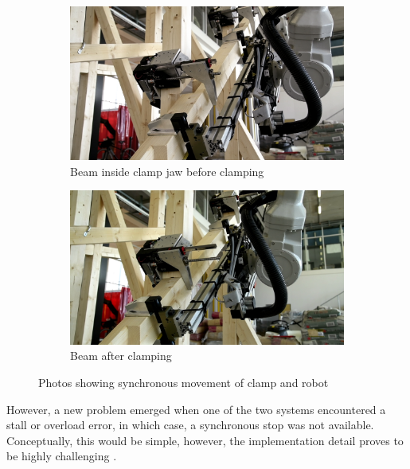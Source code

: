 \begin{figure}
    \centering
    \begin{subfigure}[b]{0.49\textwidth}
        \centering
        \includegraphics[width=\textwidth]{images/05/image86.png}
        \caption{Beam inside clamp jaw before clamping}
    \end{subfigure}
    \hfill
    \begin{subfigure}[b]{0.49\textwidth}
        \centering
        \includegraphics[width=\textwidth]{images/05/image29.png}
        \caption{Beam after clamping}
    \end{subfigure}
    \caption{Photos showing synchronous movement of clamp and robot}
    \label{fig:busstop-clamp-sync-move}
\end{figure}

However, a new problem emerged when one of the two systems encountered a stall or overload error, in which case, a synchronous stop was not available. Conceptually, this would be simple, however, the implementation detail proves to be highly challenging .

